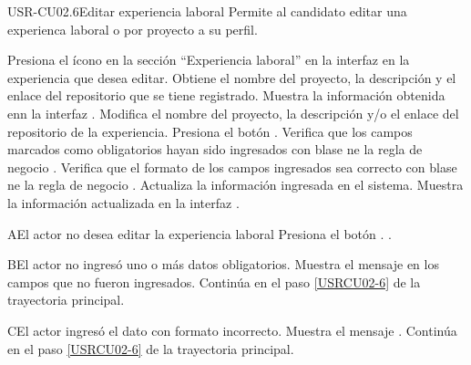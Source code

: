 \begin{UseCase}[]{USR-CU02.6}{Editar experiencia laboral}{
	Permite al candidato editar una experienca laboral o por proyecto a su perfil.
}
\end{UseCase}

\begin{UCtrayectoria}
	\UCpaso [\UCactor] Presiona el ícono \IUEditar{} en la sección ``Experiencia laboral'' en la interfaz  en la experiencia que desea editar.
	\UCpaso Obtiene el nombre del proyecto, la descripción y el enlace del repositorio que se tiene registrado.
	\UCpaso Muestra la información obtenida enn la interfaz .
	\UCpaso [\UCsist] \label{USRCU02-6} Modifica el nombre del proyecto, la descripción y/o el enlace del repositorio de la experiencia.
	\UCpaso [\UCsist] Presiona el botón .
	\UCpaso Verifica que los campos marcados como obligatorios hayan sido ingresados con blase ne la regla de negocio .
	\UCpaso Verifica que el formato de los campos ingresados sea correcto con blase ne la regla de negocio .
	\UCpaso Actualiza la información ingresada en el sistema.
	\UCpaso Muestra la información actualizada en la interfaz . 
\end{UCtrayectoria}

\begin{UCtrayectoriaA}{A}{El actor no desea editar la experiencia laboral}
	\UCpaso [\UCsist] Presiona el botón .
	.
\end{UCtrayectoriaA} 

\begin{UCtrayectoriaA}{B}{El actor no ingresó uno o más datos obligatorios.}
	\UCpaso [\UCsist] Muestra el mensaje  en los campos que no fueron ingresados.
	\UCpaso [\UCsist] Continúa en el paso \ref{USRCU02-6} de la trayectoria principal.
\end{UCtrayectoriaA} 

\begin{UCtrayectoriaA}{C}{El actor ingresó el dato con formato incorrecto.}
	\UCpaso [\UCsist] Muestra el mensaje .
	\UCpaso [\UCsist] Continúa en el paso \ref{USRCU02-6} de la trayectoria principal.
\end{UCtrayectoriaA}




